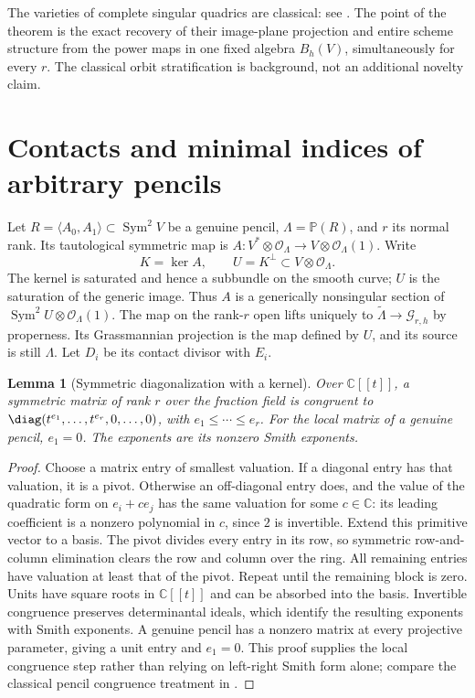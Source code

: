 \documentclass[11pt,reqno]{amsart}
\numberwithin{equation}{section}
\newtheorem{lemma}[theorem]{Lemma}
\theoremstyle{definition}\newtheorem{definition}[theorem]{Definition}
\theoremstyle{remark}\newtheorem{remark}[theorem]{Remark}
\newcommand{\C}{\mathbb C}\newcommand{\Q}{\mathbb Q}
\newcommand{\Pj}{\mathbb P}\newcommand{\A}{\mathbb A}
\newcommand{\OO}{\mathcal O}\newcommand{\II}{\mathcal I}
\DeclareMathOperator{\Sym}{Sym}\DeclareMathOperator{\Gr}{Gr}
\begin{document}
The varieties of complete singular quadrics are classical: see
\cite[Definition~2.5, Remark~2.6 and Theorem~2.14]{CasarottiCornianiMassarenti2023}.
The point of the theorem is the exact recovery of their image-plane
projection and entire scheme structure from the power maps in one
fixed algebra $B_h(V)$, simultaneously for every $r$. The classical
orbit stratification is background, not an additional novelty claim.

\section{Contacts and minimal indices of arbitrary pencils}
\label{sec:singular-pencil-v158}
Let $R=\langle A_0,A_1\rangle\subset\Sym^2V$ be a genuine pencil,
$\Lambda=\Pj(R)$, and $r$ its normal rank. Its tautological symmetric
map is $A:V^*\otimes\OO_\Lambda\to V\otimes\OO_\Lambda(1)$.
Write
\[
 K=\ker A,\qquad U=K^\perp\subset V\otimes\OO_\Lambda.
\]
The kernel is saturated and hence a subbundle on the smooth curve;
$U$ is the saturation of the generic image. Thus $A$ is a generically
nonsingular section of $\Sym^2U\otimes\OO_\Lambda(1)$.
The map on the rank-$r$ open lifts uniquely to
$\widetilde\Lambda\to\mathcal G_{r,h}$ by properness. Its
Grassmannian projection is the map defined by $U$, and its source is
still $\Lambda$. Let $D_i$ be its contact divisor with $E_i$.

\begin{lemma}[Symmetric diagonalization with a kernel]
\label{lem:symmetric-dvr-v158}
Over $\C[[t]]$, a symmetric matrix of rank $r$ over the fraction field
is congruent to $\diag(t^{e_1},\ldots,t^{e_r},0,\ldots,0)$, with
$e_1\leq\cdots\leq e_r$. For the local matrix of a genuine pencil,
$e_1=0$. The exponents are its nonzero Smith exponents.
\end{lemma}
\begin{proof}
Choose a matrix entry of smallest valuation. If a diagonal entry
has that valuation, it is a pivot. Otherwise an off-diagonal entry
does, and the value of the quadratic form on $e_i+c e_j$ has the
same valuation for some $c\in\C$: its leading coefficient is a
nonzero polynomial in $c$, since $2$ is invertible. Extend this
primitive vector to a basis. The pivot divides every entry in its
row, so symmetric row-and-column elimination clears the row and
column over the ring. All remaining entries have valuation at least
that of the pivot. Repeat until the remaining block is zero.
Units have square roots in $\C[[t]]$ and can be absorbed into the
basis. Invertible congruence preserves determinantal ideals, which
identify the resulting exponents with Smith exponents. A genuine
pencil has a nonzero matrix at every projective parameter, giving a
unit entry and $e_1=0$. This proof supplies the local congruence step
rather than relying on left-right Smith form alone; compare the
classical pencil congruence treatment in \cite{Thompson1991}.
\end{proof}
\end{document}

